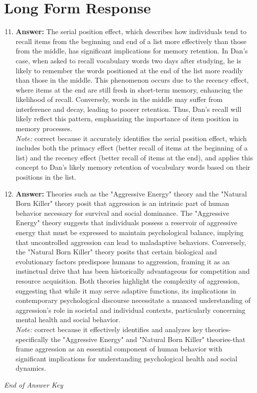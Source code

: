 \documentclass[12pt]{article}
\begin{document}
\section*{Long Form Response}
\begin{enumerate}[label=\arabic*.]
\setcounter{enumi}{10}
\item \textbf{Answer:} The serial position effect, which describes how individuals tend to recall items from the beginning and end of a list more effectively than those from the middle, has significant implications for memory retention. In Dan's case, when asked to recall vocabulary words two days after studying, he is likely to remember the words positioned at the end of the list more readily than those in the middle. This phenomenon occurs due to the recency effect, where items at the end are still fresh in short-term memory, enhancing the likelihood of recall. Conversely, words in the middle may suffer from interference and decay, leading to poorer retention. Thus, Dan's recall will likely reflect this pattern, emphasizing the importance of item position in memory processes.
\\ \textit{Note:} correct because it accurately identifies the serial position effect, which includes both the primacy effect (better recall of items at the beginning of a list) and the recency effect (better recall of items at the end), and applies this concept to Dan's likely memory retention of vocabulary words based on their positions in the list.
\item \textbf{Answer:} Theories such as the "Aggressive Energy" theory and the "Natural Born Killer" theory posit that aggression is an intrinsic part of human behavior necessary for survival and social dominance. The "Aggressive Energy" theory suggests that individuals possess a reservoir of aggressive energy that must be expressed to maintain psychological balance, implying that uncontrolled aggression can lead to maladaptive behaviors. Conversely, the "Natural Born Killer" theory posits that certain biological and evolutionary factors predispose humans to aggression, framing it as an instinctual drive that has been historically advantageous for competition and resource acquisition. Both theories highlight the complexity of aggression, suggesting that while it may serve adaptive functions, its implications in contemporary psychological discourse necessitate a nuanced understanding of aggression's role in societal and individual contexts, particularly concerning mental health and social behavior.
\\ \textit{Note:} correct because it effectively identifies and analyzes key theories-specifically the "Aggressive Energy" and "Natural Born Killer" theories-that frame aggression as an essential component of human behavior with significant implications for understanding psychological health and social dynamics.
\end{enumerate}

\vfill
\noindent\textit{End of Answer Key}
\end{document}
